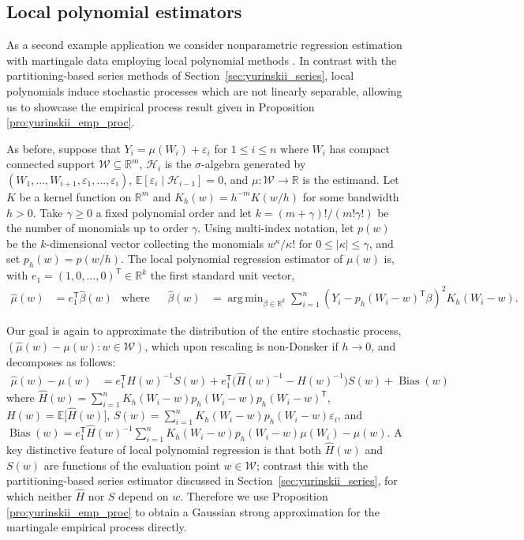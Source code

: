 \documentclass[11pt,lof]{puthesis}
\newcommand{\R}{\ensuremath{\mathbb{R}}}
\newcommand{\E}{\ensuremath{\mathbb{E}}}
\newcommand{\cH}{\ensuremath{\mathcal{H}}}
\newcommand{\cW}{\ensuremath{\mathcal{W}}}
\newcommand{\T}{\ensuremath{\mathsf{T}}}
\DeclareMathOperator{\Bias}{Bias}
\DeclareMathOperator*{\argmin}{arg\,min}
\theoremstyle{break}
\theoremstyle{proof}
\begin{document}
\subsection{Local polynomial estimators}
\label{sec:yurinskii_local_poly}

As a second example application we consider nonparametric regression estimation
with martingale data employing local polynomial methods
\citep{fan1996local}. In contrast with the partitioning-based series
methods of Section~\ref{sec:yurinskii_series}, local polynomials induce
stochastic
processes which are not linearly separable, allowing us to showcase the
empirical process result given in Proposition \ref{pro:yurinskii_emp_proc}.

As before, suppose that
$Y_i = \mu(W_i) + \varepsilon_i$
for $ 1 \leq i \leq n$
where $W_i$ has compact connected support $\cW \subseteq \R^m$,
$\cH_i$ is the $\sigma$-algebra generated by
$(W_1, \ldots, W_{i+1}, \varepsilon_1, \ldots, \varepsilon_i)$,
$\E[\varepsilon_i \mid \cH_{i-1}] = 0$,
and $\mu: \cW \to \R$ is the estimand. Let $K$ be a kernel function on $\R^m$
and $K_h(w) = h^{-m} K(w/h)$ for some bandwidth $h > 0$.
Take $\gamma \geq 0$ a fixed polynomial order and let
$k = (m+\gamma)!/(m!\gamma!)$ be the number of monomials up to order $\gamma$.
Using multi-index notation,
let $p(w)$ be the $k$-dimensional vector
collecting the monomials $w^{\kappa}/\kappa!$
for $0 \leq |\kappa| \leq \gamma$,
and set $p_h(w) = p(w/h)$.
The local polynomial regression estimator of $\mu(w)$ is,
with $e_1 = (1, 0, \ldots, 0)^\T \in \R^k$ the first standard unit vector,
%
\begin{align*}
\hat{\mu}(w)
&=
e_1^\T\hat{\beta}(w)
&\text{where} &
&\hat{\beta}(w)
&=
\argmin_{\beta \in \R^{k}}
\sum_{i=1}^n
\left(Y_i - p_h(W_i-w)^\T \beta \right)^2
K_h(W_i-w).
\end{align*}

Our goal is again to approximate the distribution of the entire stochastic
process, $(\hat{\mu}(w)-\mu(w):w\in\cW)$, which upon rescaling is non-Donsker
if $h \to 0$, and decomposes as follows:
%
\begin{align*}
\hat{\mu}(w)-\mu(w)
&= e_1^\T H(w)^{-1} S(w)
+ e_1^\T \big(\hat H(w)^{-1} - H(w)^{-1}\big) S(w)
+ \Bias(w)
\end{align*}
%
where
$\hat H(w) = \sum_{i=1}^n K_h(W_i-w) p_h(W_i-w) p_h(W_i-w)^\T$,
$H(w) = \E \big[ \hat H(w) \big]$,
$S(w)= \sum_{i=1}^n K_h(W_i-w) p_h(W_i-w) \varepsilon_i$,
and
$\Bias(w) = e_1^\T \hat H(w)^{-1}
\sum_{i=1}^n K_h(W_i-w) p_h(W_i-w) \mu(W_i) - \mu(w)$.
A key distinctive feature of local polynomial regression is that both
$\hat H(w)$ and $S(w)$ are functions of the evaluation point $w\in\cW$;
contrast this with the partitioning-based series estimator discussed in
Section~\ref{sec:yurinskii_series}, for which neither $\hat H$ nor $S$ depend
on $w$.
Therefore we use Proposition \ref{pro:yurinskii_emp_proc} to obtain a Gaussian
strong
approximation for the martingale empirical process directly.
\end{document}
